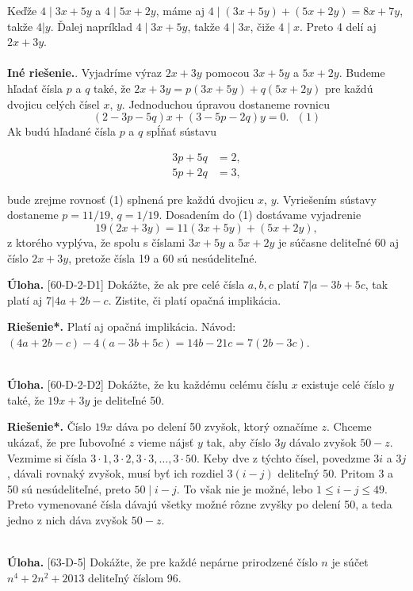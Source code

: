 \documentclass[11pt,a4paper,oneside,final]{book}
\newcommand{\ul}{\textbf{Úloha.} }
\newcommand{\rieh}{\textbf{Riešenie*.} }
\begin{document}
Keďže $4 \mid 3x + 5y$ a $4 \mid 5x + 2y$, máme aj $4 \mid (3x + 5y) + (5x + 2y) = 8x + 7y$, takže $4 | y$. Ďalej napríklad $4 \mid 3x + 5y$, takže $4 \mid 3x$, čiže $4 \mid x$. Preto 4 delí aj $2x + 3y$.\\
\\
\textbf{Iné riešenie.}. Vyjadríme výraz $2x + 3y$ pomocou $3x + 5y$ a $5x + 2y$. Budeme hľadať čísla $p$ a $q$ také, že $2x + 3y = p(3x + 5y) + q(5x + 2y)$ pre každú dvojicu celých čísel $x$, $y$. Jednoduchou úpravou dostaneme rovnicu
$$(2 - 3p - 5q)x + (3 - 5p - 2q)y = 0. \ \ \ (1)$$
Ak budú hľadané čísla $p$ a $q$ spĺňať sústavu
\begin{center}
\begin{align*}
3p + 5q &= 2,\\
5p + 2q &= 3,
\end{align*}
\end{center}
bude zrejme rovnosť (1) splnená pre každú dvojicu $x$, $y$. Vyriešením sústavy dostaneme $p = 11/19$, $q = 1/19$. Dosadením do (1) dostávame vyjadrenie
$$19(2x + 3y) = 11(3x + 5y) + (5x + 2y),$$
z ktorého vyplýva, že spolu s číslami $3x + 5y$ a $5x + 2y$ je súčasne deliteľné 60 aj číslo $2x + 3y$, pretože čísla 19 a 60 sú nesúdeliteľné.\\


\begin{tcolorbox}[breakable,notitle,boxrule=0pt,colback=light-gray,colframe=light-gray]\ul [60-D-2-D1] Dokážte, že ak pre celé čísla $a, b, c$ platí $7 | a - 3b + 5c$, tak platí aj $7 | 4a + 2b - c$. Zistite, či platí opačná implikácia.

\end{tcolorbox}

\rieh Platí aj opačná implikácia. Návod: $(4a + 2b - c)- 4(a - 3b + 5c) = 14b - 21c = 7(2b - 3c)$.\\
\\
\begin{tcolorbox}[breakable,notitle,boxrule=0pt,colback=light-gray,colframe=light-gray]\ul [60-D-2-D2] Dokážte, že ku každému celému číslu $x$ existuje celé číslo $y$ také, že $19x+3y$ je deliteľné 50.

\end{tcolorbox}

\rieh Číslo $19x$ dáva po delení 50 zvyšok, ktorý označíme $z$. Chceme ukázať, že pre ľubovoľné $z$ vieme nájsť $y$ tak, aby číslo $3y$ dávalo zvyšok $50 - z$. Vezmime si čísla $3 \cdot 1, 3 \cdot 2, 3 \cdot 3, \ldots , 3 \cdot 50$. Keby dve z týchto čísel, povedzme $3i$ a $3j$, dávali rovnaký zvyšok, musí byť ich rozdiel $3(i - j)$ deliteľný 50. Pritom 3 a 50 sú nesúdeliteľné, preto $50 \mid i - j$. To však nie je možné, lebo $1 \leq i - j \leq 49$. Preto vymenované čísla dávajú všetky možné rôzne zvyšky po delení 50, a teda jedno z nich dáva zvyšok $50 - z$.\\
\\
\begin{tcolorbox}[breakable,notitle,boxrule=0pt,colback=light-gray,colframe=light-gray]\ul [63-D-5]
Dokážte, že pre každé nepárne prirodzené číslo $n$ je súčet $n^4 + 2n^2 + 2 013$ deliteľný číslom 96.

\end{tcolorbox}
\end{document}
